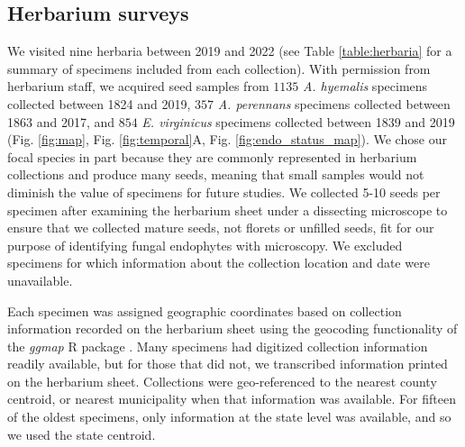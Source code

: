 \documentclass[11pt]{article}
\newcommand{\firstrevise}[1]{{\color{black}{#1}}}
\newcommand{\secondrevise}[1]{{\color{black}{#1}}}
\begin{document}
		\subsection*{Herbarium surveys}
We visited nine herbaria between 2019 and 2022 (see Table \ref{table:herbaria} for a summary of specimens included from each collection). 
With permission from herbarium staff, we acquired seed samples from $1135$ \emph{A. hyemalis} specimens collected between 1824 and 2019, $357$ \emph{A. perennans} specimens collected between 1863 and 2017, and $854$ \emph{E. virginicus} specimens collected between 1839 and 2019 (Fig. \ref{fig:map}, Fig. \ref{fig:temporal}A, Fig. \ref{fig:endo_status_map}).
We chose our focal species in part because they are commonly represented in herbarium collections and produce many seeds, meaning that small samples would not diminish the value of specimens for future studies. 
We collected 5-10 seeds per specimen after examining the herbarium sheet under a dissecting microscope to ensure that we collected mature seeds, not florets or unfilled seeds, fit for our purpose of identifying fungal endophytes with microscopy.
We excluded specimens for which information about the collection location and date were unavailable.

Each specimen was assigned geographic coordinates based on collection information recorded on the herbarium sheet using the geocoding functionality of the \emph{ggmap} R package \citep{kahle2019package}.
Many specimens had digitized collection information readily available, but for those that did not, we transcribed information printed on the herbarium sheet. 
\secondrevise{The identity of each specimen collector was gathered as part of the sample's metadata.}
Collections were geo-referenced to the nearest county centroid, or nearest municipality when that information was available. 
For fifteen of the oldest specimens, only information at the state level was available, and so we used the state centroid.
\linelabel{R2C24-begin}\firstrevise{The median pairwise distance between georeferenced coordinate points was 841 km.
The median longitudinal width of the bounding boxes generated to geocode municipality, county, or state centroids was 44.7 km. 
Among those specimens geo-referenced at the state level, the largest bounding box, spanning the state of Texas, was 1233 km wide.
The smallest bounding boxes were less than 1 km across for small municipalities (while this suggests high precision, we note that some specimens were collected in natural habitat nearby to small municipalities not encompassed by these bounding boxes).}
\end{document}

